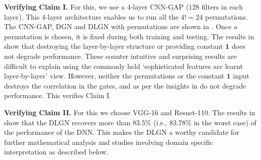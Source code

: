 \textbf{Verifying Claim I.} For this, we use a $4$-layer CNN-GAP ($128$ filters in each layer). This $4$-layer architecture enables us to run all the $4!=24$ permutations. The CNN-GAP, DGN and DLGN with permutations are shown in . Once a permutation is chosen, it is fixed during both training and testing. The results in  show that destroying the layer-by-layer structure or providing constant $\mathbf{1}$ does not degrade performance. These counter intuitive and surprising results are difficult to explain using the commonly held `sophisticated features are learnt layer-by-layer' view. However, neither the permutations or the constant $\mathbf{1}$ input destroys the correlation in the gates, and as per the insights in  do not degrade performance. This verifies Claim I.  %





\textbf{Verifying Claim II.} For this we choose VGG-16 and Resnet-110. The results in  show that the DLGN recovers more than $83.5\%$ (i.e., $83.78\%$ in the worst case) of the performance of the DNN. %
This makes the DLGN a worthy candidate for further mathematical analysis and studies involving domain specific interpretation as described below.

